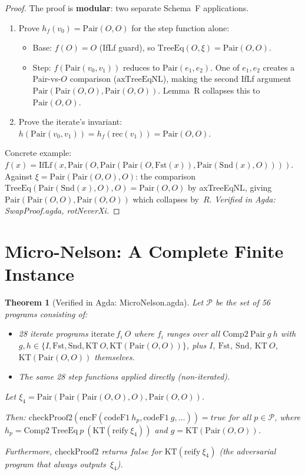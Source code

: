 \documentclass[11pt]{article}
\newtheorem{theorem}{Theorem}
\begin{document}
\begin{proof}
The proof is \textbf{modular}: two separate Schema~F applications.
\begin{enumerate}
\item Prove $h_f(v_0) = \mathrm{Pair}(O,O)$ for the step function alone:
  \begin{itemize}
  \item Base: $f(O) = O$ (IfLf guard), so $\mathrm{TreeEq}(O, \xi) = \mathrm{Pair}(O,O)$.
  \item Step: $f(\mathrm{Pair}(v_0, v_1))$ reduces to $\mathrm{Pair}(e_1, e_2)$.
    One of $e_1, e_2$ creates a Pair-vs-$O$ comparison ($\mathrm{axTreeEqNL}$),
    making the second IfLf argument $\mathrm{Pair}(\mathrm{Pair}(O,O), \mathrm{Pair}(O,O))$.
    Lemma~R collapses this to $\mathrm{Pair}(O,O)$.
  \end{itemize}
\item Prove the iterate's invariant: $h(\mathrm{Pair}(v_0, v_1)) = h_f(\mathrm{rec}(v_1)) = \mathrm{Pair}(O,O)$.
\end{enumerate}

Concrete example: $f(x) = \mathrm{IfLf}(x, \mathrm{Pair}(O, \mathrm{Pair}(\mathrm{Pair}(O, \mathrm{Fst}(x)), \mathrm{Pair}(\mathrm{Snd}(x), O))))$.
Against $\xi = \mathrm{Pair}(\mathrm{Pair}(O,O), O)$:
the comparison $\mathrm{TreeEq}(\mathrm{Pair}(\mathrm{Snd}(x), O), O) = \mathrm{Pair}(O,O)$ by axTreeEqNL,
giving $\mathrm{Pair}(\mathrm{Pair}(O,O), \mathrm{Pair}(O,O))$ which collapses by~$R$.
\emph{Verified in Agda: SwapProof.agda, rotNeverXi.}
\end{proof}

\section{Micro-Nelson: A Complete Finite Instance}

\begin{theorem}[Verified in Agda: MicroNelson.agda]
Let $\mathcal{P}$ be the set of 56 programs consisting of:
\begin{itemize}
\item 28 iterate programs $\mathrm{iterate}\ f_i\ O$ where $f_i$ ranges over
  all $\mathrm{Comp2\ Pair}\ g\ h$ with $g, h \in \{I, \mathrm{Fst}, \mathrm{Snd}, \mathrm{KT}\ O, \mathrm{KT}(\mathrm{Pair}(O,O))\}$,
  plus $I$, $\mathrm{Fst}$, $\mathrm{Snd}$, $\mathrm{KT}\ O$, $\mathrm{KT}(\mathrm{Pair}(O,O))$ themselves.
\item The same 28 step functions applied directly (non-iterated).
\end{itemize}

Let $\xi_4 = \mathrm{Pair}(\mathrm{Pair}(\mathrm{Pair}(O,O), O), \mathrm{Pair}(O,O))$.

Then: $\mathrm{checkProof2}(\mathrm{encF}(\mathrm{codeF1}\ h_p, \mathrm{codeF1}\ g, \ldots)) = \mathit{true}$
for all $p \in \mathcal{P}$, where $h_p = \mathrm{Comp2\ TreeEq}\ p\ (\mathrm{KT}(\mathrm{reify}\ \xi_4))$
and $g = \mathrm{KT}(\mathrm{Pair}(O,O))$.

Furthermore, $\mathrm{checkProof2}$ returns $\mathit{false}$ for $\mathrm{KT}(\mathrm{reify}\ \xi_4)$
(the adversarial program that always outputs~$\xi_4$).
\end{theorem}
\end{document}
